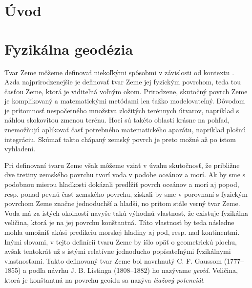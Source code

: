 \documentclass[a4paper, 12pt]{book}
\begin{document}
\tableofcontents
\newpage







\chapter*{Úvod}







\chapter{Fyzikálna geodézia}

Tvar Zeme môžeme definovať niekoľkými spôsobmi v závislosti od kontextu 
\citep{MoritzTheFigureOfTheEarth}.  Azda najprirodzenejšie je definovať tvar 
Zeme jej fyzickým povrchom, teda tou časťou Zeme, ktorá je viditeľná voľným 
okom.  Prirodzene, skutočný povrch Zeme je komplikovaný a matematickými 
metódami len ťažko modelovateľný.  Dôvodom je prítomnosť nespočetného množstva 
zložitých terénnych útvarov, napríklad s náhlou skokovitou zmenou terénu.  Hoci 
sú takéto oblasti krásne na pohľad, znemožňujú aplikovať časť potrebného 
matematického aparátu, napríklad plošnú integráciu.  Skúmať takto chápaný 
zemský povrch je preto možné až po istom vyhladení.

Pri definovaní tvaru Zeme však môžeme vziať v úvahu skutočnosť, že približne 
dve tretiny zemského povrchu tvorí voda v podobe oceánov a morí.  Ak by sme 
s podobnou mierou hladkosti dokázali predĺžiť povrch oceánov a morí aj popod, 
resp. ponad pevnú časť zemského povrchu, získali by sme v porovnaní s fyzickým 
povrchom Zeme značne jednoduchší a hladší, no pritom stále verný tvar Zeme.  
Voda má za istých okolností navyše takú výhodnú vlastnosť, že existuje 
fyzikálna veličina, ktorá je na jej povrchu konštantná.  Táto vlastnosť by teda 
následne mohla umožniť akúsi predikciu morskej hladiny aj pod, resp. nad 
kontinentmi.  Inými slovami, v tejto definícií tvaru Zeme by išlo opäť 
o geometrickú plochu, avšak tentokrát už s istými relatívne jednoducho 
popísateľnými fyzikálnymi vlastnosťami.  Takto definovaný tvar Zeme bol 
navrhnutý C. F. Gaussom (1777--1855) a podľa návrhu J. B. Listinga (1808--1882) 
ho nazývame \emph{geoid}.  Veličina, ktorá je konštantná na povrchu geoidu sa 
nazýva \emph{tiažový potenciál}.
\end{document}
